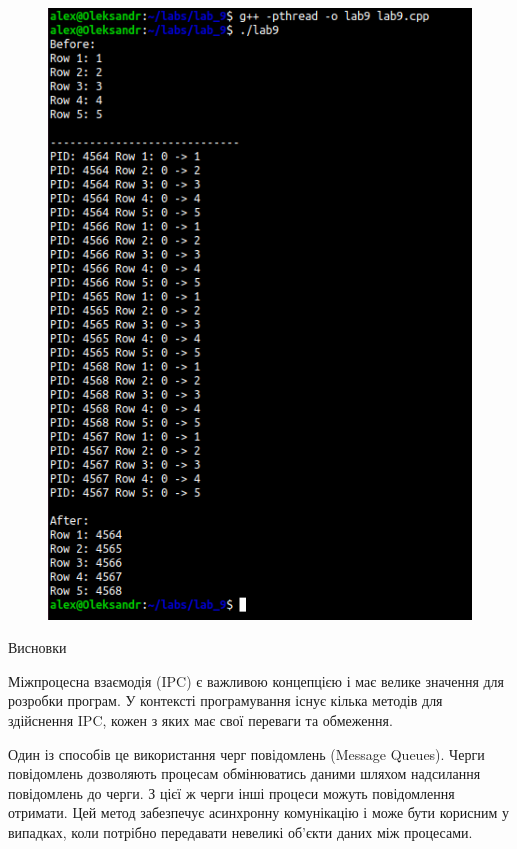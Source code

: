 \documentclass[a4paper,12pt]{article}
\begin{document}
\newpage
    \begin{figure}[h!]
        \begin{minipage}[h]{1\linewidth}
            \centering
            \includegraphics[width=0.8\linewidth]{Prt sc/Figure_2.png}  
        \end{minipage}
    \end{figure}

\newpage
    \begin{center}
        \Large{Висновки}
    \end{center}

    Міжпроцесна взаємодія (IPC) є важливою концепцією і має велике значення для розробки програм. 
    У контексті програмування існує кілька методів для здійснення IPC, кожен з яких має свої переваги та обмеження.

    Один із способів це використання черг повідомлень (Message Queues). Черги повідомлень дозволяють процесам обмінюватись даними шляхом надсилання повідомлень до черги. 
    З цієї ж черги інші процеси можуть повідомлення отримати. Цей метод забезпечує асинхронну комунікацію і може бути корисним у випадках, коли потрібно передавати 
    невеликі об'єкти даних між процесами.
\end{document}
